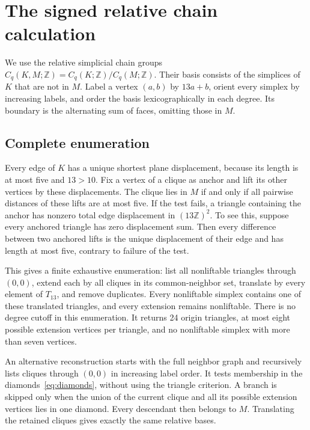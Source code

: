 \documentclass[11pt]{amsart}
\newcommand{\Z}{\mathbb Z}
\begin{document}
\section{The signed relative chain calculation}
We use the relative simplicial chain groups
$C_q(K,M;\Z)=C_q(K;\Z)/C_q(M;\Z)$. Their basis consists of the simplices
of $K$ that are not in $M$. Label a vertex $(a,b)$ by $13a+b$, orient every
simplex by increasing labels, and order the basis lexicographically in
each degree. Its boundary is the alternating sum of faces, omitting those
in $M$.

\subsection{Complete enumeration}
Every edge of $K$ has a unique shortest plane displacement, because its
length is at most five and $13>10$. Fix a vertex of a clique as anchor and
lift its other vertices by these displacements. The clique lies in $M$
if and only if all pairwise distances of these lifts are at most five.
If the test fails, a triangle containing the anchor has nonzero total
edge displacement in $(13\Z)^2$. To see this, suppose every anchored
triangle has zero displacement sum. Then every difference between two
anchored lifts is the unique displacement of their edge and has length
at most five, contrary to failure of the test.

This gives a finite exhaustive enumeration: list all nonliftable triangles
through $(0,0)$, extend each by all cliques in its common-neighbor set,
translate by every element of $T_{13}$, and remove duplicates. Every
nonliftable simplex contains one of these translated triangles, and every
extension remains nonliftable. There is no degree cutoff in this
enumeration. It returns 24 origin triangles, at most eight possible
extension vertices per triangle, and no nonliftable simplex with more
than seven vertices.

An alternative reconstruction starts with the full neighbor graph and
recursively lists cliques through $(0,0)$ in increasing label order.
It tests membership in the diamonds~\eqref{eq:diamonds}, without using
the triangle criterion. A branch is skipped only when the union of the
current clique and all its possible extension vertices lies in one
diamond. Every descendant then belongs to $M$. Translating the retained
cliques gives exactly the same relative bases.
\end{document}

